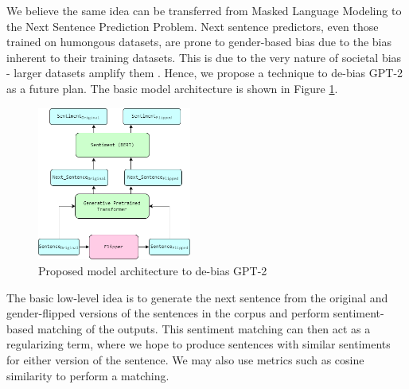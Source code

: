 \documentclass[10pt,twocolumn,letterpaper]{article}
\begin{document}
We believe the same idea can be transferred from Masked Language Modeling to the Next Sentence Prediction Problem.
Next sentence predictors, even those trained on humongous datasets, are prone to gender-based bias due to the bias inherent to their training datasets.
This is due to the very nature of societal bias - larger datasets amplify them \cite{bias}.
Hence, we propose a technique to de-bias GPT-2 as a future plan.
The basic model architecture is shown in Figure \ref{fig:future}.
\begin{figure}
    \centering
    \includegraphics[width=0.45\textwidth]{Assets/future_model.png}
    \caption{Proposed model architecture to de-bias GPT-2}
    \label{fig:future}
\end{figure}
The basic low-level idea is to generate the next sentence from the original and gender-flipped versions of the sentences in the corpus and perform sentiment-based matching of the outputs.
This sentiment matching can then act as a regularizing term, where we hope to produce sentences with similar sentiments for either version of the sentence.
We may also use metrics such as cosine similarity to perform a matching.

{\small


}
\end{document}

